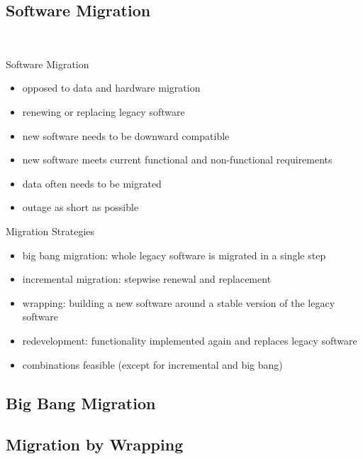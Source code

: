 \subsection{Software Migration}
\begin{frame}{\insertsubsection\ \mytitlesource{\ludewiglichter}}
	\begin{fancycolumns}
		\begin{definition}{Software Migration}
			\begin{itemize}
				\item opposed to data and hardware migration
				\item renewing or replacing legacy software
				\item new software needs to be downward compatible
				\item new software meets current functional and non-functional requirements
				\item data often needs to be migrated
				\item outage as short as possible
			\end{itemize}
		\end{definition}
		\nextcolumn
		\begin{note}{Migration Strategies}
			\begin{itemize}
				\item big bang migration: whole legacy software is migrated in a single step
				\item incremental migration: stepwise renewal and replacement
				\item wrapping: building a new software around a stable version of the legacy software
				\item redevelopment: functionality implemented again and replaces legacy software
				\item combinations feasible (except for incremental and big bang)
			\end{itemize}
		\end{note}
	\end{fancycolumns}
\end{frame}

\subsection{Big Bang Migration}

\subsection{Migration by Wrapping}

